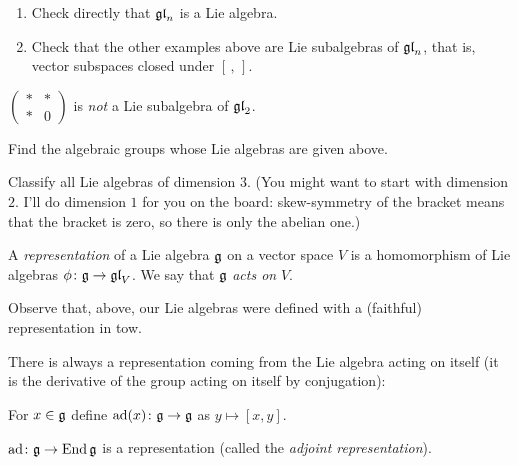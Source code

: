 \begin{exercise}\leavevmode
\begin{enumerate}
  \item Check directly that $\mathfrak{gl}_n$ is a Lie algebra.
  \item Check that the other examples above are Lie subalgebras of $\mathfrak{gl}_n$,
    that is, vector subspaces closed under $[\,,\,]$.
\end{enumerate}
\end{exercise}

\begin{example}
$\begin{pmatrix} * & * \\ * & 0 \end{pmatrix}$ is \emph{not} a Lie subalgebra
of $\mathfrak{gl}_2$.
\end{example}

\begin{exercise}
Find the algebraic groups whose Lie algebras are given above.
\end{exercise}

\begin{exercise}
Classify all Lie algebras of dimension $3$. (You might want to start with
dimension $2$. I'll do dimension $1$ for you on the board: skew-symmetry of
the bracket means that the bracket is zero, so there is only the abelian one.)
\end{exercise}

\begin{definition}
A \emph{representation} of a Lie algebra $\mathfrak{g}$ on a vector space $V$ is a
homomorphism of Lie algebras $\phi\colon \mathfrak{g} \to \mathfrak{gl}_V$. We say that $\mathfrak{g}$
\emph{acts on} $V$.
\end{definition}

Observe that, above, our Lie algebras were defined with a (faithful)
representation in tow.

There is always a representation coming from the Lie algebra acting on itself
(it is the derivative of the group acting on itself by conjugation):

\begin{definition}
For $x \in \mathfrak{g}$ define $\operatorname{ad}(x)\colon \mathfrak{g} \to \mathfrak{g}$ as $y \mapsto [x, y]$.
\end{definition}

\begin{lemma}
$\operatorname{ad}\colon \mathfrak{g} \to \operatorname{End} \mathfrak{g}$ is a representation (called the \emph{adjoint
representation}).
\end{lemma}

